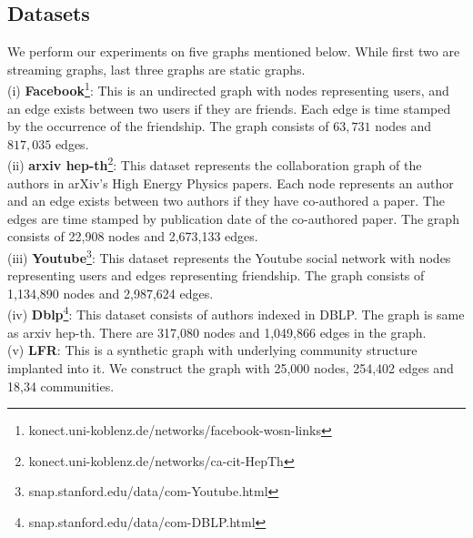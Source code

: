 \subsection{Datasets}\label{sec:dataset}

We perform our experiments on five graphs mentioned below. While first two are streaming graphs, last three graphs are static graphs. \\
(i) {\bf Facebook}\footnote{konect.uni-koblenz.de/networks/facebook-wosn-links}:
  	This is an undirected graph with  nodes representing users, and an edge exists between two users if they are friends. Each edge is time stamped by the occurrence of the friendship. 
    The graph consists of $63,731$ nodes and $817,035$ edges.\\ %
 (ii) {\bf arxiv hep-th}\footnote{konect.uni-koblenz.de/networks/ca-cit-HepTh}:
    This dataset represents the collaboration graph of the authors in arXiv's High Energy Physics papers. Each node represents an author and an edge exists between two authors if they have co-authored a paper. The edges are time stamped by publication date of the co-authored paper. The graph consists of 22,908 nodes and 2,673,133 edges.\\%
(iii) {\bf Youtube}\footnote{snap.stanford.edu/data/com-Youtube.html}:
This dataset represents the Youtube social network with nodes representing users and edges representing friendship. The graph consists of 1,134,890 nodes and 2,987,624 edges. \\
(iv) {\bf Dblp}\footnote{snap.stanford.edu/data/com-DBLP.html}:
This dataset consists of authors indexed in DBLP. The graph is same as arxiv hep-th. There are 317,080 nodes and 1,049,866 edges in the graph. \\
(v) {\bf LFR}: This is a synthetic graph 
 \cite{lancichinetti2008benchmark} with underlying community structure implanted into it. We construct the graph with  25,000 nodes, 254,402 edges and 18,34 communities.


